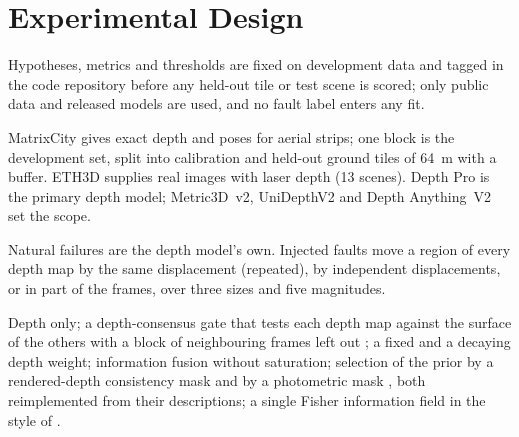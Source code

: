 \section{Experimental Design}
\label{sec:setup}
Hypotheses, metrics and thresholds are fixed on development data and tagged in the code repository before
any held-out tile or test scene is scored; only public data and released models are used, and no fault
label enters any fit.

 MatrixCity \cite{data_matrixcity} gives exact depth and poses for aerial strips; one block is
the development set, split into calibration and held-out ground tiles of 64~m with a buffer.
ETH3D \cite{data_eth3d} supplies real images with laser depth (13 scenes). Depth Pro \cite{est_depthpro} is
the primary depth model; Metric3D~v2, UniDepthV2 and Depth Anything~V2
\cite{est_metric3dv2,est_unidepth,est_dav2} set the scope.

 Natural failures are the depth model's own. Injected faults move a region of every depth
map by the same displacement (repeated), by independent displacements, or in part of the frames, over
three sizes and five magnitudes.

 Depth only; a depth-consensus gate that tests each depth map against the surface of
the others with a block of neighbouring frames left out \cite{stat_teunissen_dia,flt_raim_joerger}; a
fixed and a decaying depth weight; information fusion without saturation; selection of the prior by a
rendered-depth consistency mask \cite{dep_indepthwetrust} and by a photometric mask
\cite{dep_reliability}, both reimplemented from their descriptions; a single Fisher information field in
the style of \cite{unc_fisherrf}.

